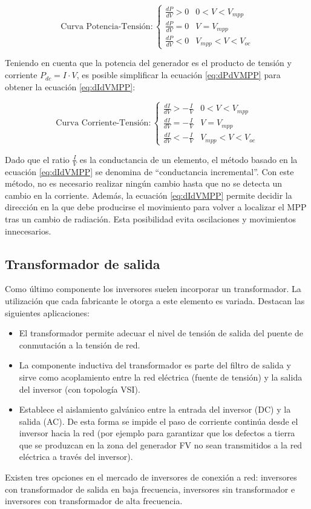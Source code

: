 \begin{equation}
\text{Curva Potencia-Tensión}:\begin{cases}
\frac{dP}{dV}>0 & 0<V<V_{mpp}\\
\frac{dP}{dV}=0 & V=V_{mpp}\\
\frac{dP}{dV}<0 & V_{mpp}<V<V_{oc}\end{cases}\label{eq:dPdVMPP}\end{equation}


Teniendo en cuenta que la potencia del generador es el producto de
tensión y corriente $P_{dc}=I\cdot V$, es posible simplificar la
ecuación \ref{eq:dPdVMPP} para obtener la ecuación \ref{eq:dIdVMPP}:

\begin{equation}
\text{Curva Corriente-Tensión}:\begin{cases}
\frac{dI}{dV}>-\frac{I}{V} & 0<V<V_{mpp}\\
\frac{dI}{dV}=-\frac{I}{V} & V=V_{mpp}\\
\frac{dI}{dV}<-\frac{I}{V} & V_{mpp}<V<V_{oc}\end{cases}\label{eq:dIdVMPP}\end{equation}


Dado que el ratio $\frac{I}{V}$ es la conductancia de un elemento,
el método basado en la ecuación \ref{eq:dIdVMPP} se denomina de \textquotedblleft{}conductancia
incremental\textquotedblright{}. Con este método, no es necesario
realizar ningún cambio hasta que no se detecta un cambio en la corriente.
Además, la ecuación \ref{eq:dIdVMPP} permite decidir la dirección
en la que debe producirse el movimiento para volver a localizar el
MPP tras un cambio de radiación. Esta posibilidad evita oscilaciones
y movimientos innecesarios.


\subsection{Transformador de salida}

Como último componente los inversores suelen incorporar un transformador.
La utilización que cada fabricante le otorga a este elemento es variada.
Destacan las siguientes aplicaciones:
\begin{itemize}
\item El transformador permite adecuar el nivel de tensión de salida del
puente de conmutación a la tensión de red.
\item La componente inductiva del transformador es parte del filtro de salida
y sirve como acoplamiento entre la red eléctrica (fuente de tensión)
y la salida del inversor (con topología VSI).
\item Establece el aislamiento galvánico entre la entrada del inversor (DC)
y la salida (AC). De esta forma se impide el paso de corriente continúa
desde el inversor hacia la red (por ejemplo para garantizar que los
defectos a tierra que se produzcan en la zona del generador FV no
sean transmitidos a la red eléctrica a través del inversor).
\end{itemize}
Existen tres opciones en el mercado de inversores de conexión a red:
inversores con transformador de salida en baja frecuencia, inversores
sin transformador e inversores con transformador de alta frecuencia. 

